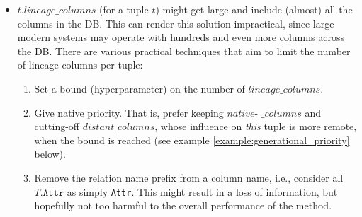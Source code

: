 \begin{itemize}
    \item $t.lineage\_columns$ (for a tuple $t$) might get large and include (almost) all the columns in the DB. This can render this solution impractical, since large modern systems may operate with hundreds and even more columns across the DB. There are various practical techniques that aim to limit the number of lineage columns per tuple:
    \begin{enumerate}
        \item Set a bound (hyperparameter) on the number of $lineage\_columns$.
        \item Give native priority. That is, prefer keeping $native$\mbox{-} $\_columns$ and cutting-off $distant\_columns$, whose influence on \textit{this} tuple is more remote, when the bound is reached (see example \ref{example:generational_priority} below).
        \item Remove the relation name prefix from a column name, i.e., consider all $T.\texttt{Attr}$ as simply \texttt{Attr}. This might result in a loss of information, but hopefully not too harmful to the overall performance of the method.
    \end{enumerate}
    
\end{itemize}



